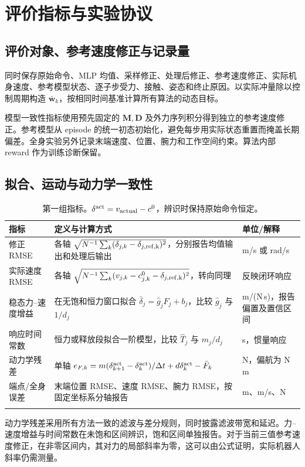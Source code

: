 \section{评价指标与实验协议}
\subsection{评价对象、参考速度修正与记录量}
同时保存原始命令、MLP 均值、采样修正、处理后修正、参考速度修正、实际机身速度、参考模型状态、逐子步受力、接触、姿态和终止原因。以实际冲量除以控制周期构造 $\bar{\bm w}_k$，按相同时间基准计算所有算法的动态目标。

模型一致性指标使用预先固定的 $\bm M,\bm D$ 及外力序列积分得到独立的参考速度修正。参考模型从 episode 的统一初态初始化，避免每步用实际状态重置而掩盖长期偏差。全身实验另外记录末端速度、位置、腕力和工作空间约束。算法内部 reward 作为训练诊断保留。

\subsection{拟合、运动与动力学一致性}
\begin{longtable}{P{28mm}P{84mm}P{30mm}}
\toprule 指标 & 定义与计算方式 & 单位/解释\\\midrule\endhead
修正 RMSE & 各轴 $\sqrt{N^{-1}\sum_k(\delta_{j,k}-\delta_{j,\rm ref,k})^2}$，分别报告均值输出和处理后输出 & m/s 或 rad/s\\
实际速度 RMSE & 各轴 $\sqrt{N^{-1}\sum_k(v_{j,k}-c^0_{j,k}-\delta_{j,\rm ref,k})^2}$，转向同理 & 反映闭环响应\\
稳态力--速度增益 & 在无饱和恒力窗口拟合 $\bar\delta_j=\hat g_jF_j+b_j$，比较 $\hat g_j$ 与 $1/d_j$ & m/(N\,s)，报告偏置及置信区间\\
响应时间常数 & 恒力或释放段拟合一阶模型，比较 $\hat T_j$ 与 $m_j/d_j$ & s，惯量响应\\
动力学残差 & 单轴 $e_{F,k}=m(\delta^{\rm act}_{k+1}-\delta^{\rm act}_k)/\Delta t+d\delta^{\rm act}_k-\bar F_k$ & N，偏航为 N\,m\\
端点/全身误差 & 末端位置 RMSE、速度 RMSE、腕力 RMSE，按固定坐标系分轴报告 & m、m/s、N\\\bottomrule
\caption{第一组指标。$\delta^{\rm act}=v_{\rm actual}-c^0$，辨识时保持原始命令恒定。}
\end{longtable}

动力学残差采用所有方法一致的滤波与差分规则，同时披露滤波带宽和延迟。力--速度增益与时间常数在未饱和区间辨识，饱和区间单独报告。对于当前三值参考速度修正，在非零区间内，其对力的局部斜率为零，这可以由公式证明，实际机器人斜率仍需测量。

